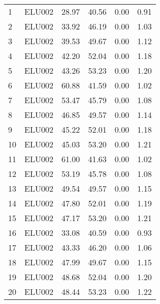 \begin{center}
\begin{footnotesize}
\tablelasttail{\hline}
\begin{supertabular}{|l|r|r|r|r|r|}
1 & ELU002 & 28.97 & 40.56 &  0.00 & 0.91\\
2 & ELU002 & 33.92 & 46.19 &  0.00 & 1.03\\
3 & ELU002 & 39.53 & 49.67 &  0.00 & 1.12\\
4 & ELU002 & 42.20 & 52.04 &  0.00 & 1.18\\
5 & ELU002 & 43.26 & 53.23 &  0.00 & 1.20\\
6 & ELU002 & 60.88 & 41.59 &  0.00 & 1.02\\
7 & ELU002 & 53.47 & 45.79 &  0.00 & 1.08\\
8 & ELU002 & 46.85 & 49.57 &  0.00 & 1.14\\
9 & ELU002 & 45.22 & 52.01 &  0.00 & 1.18\\
10 & ELU002 & 45.03 & 53.20 &  0.00 & 1.21\\
11 & ELU002 & 61.00 & 41.63 &  0.00 & 1.02\\
12 & ELU002 & 53.19 & 45.78 &  0.00 & 1.08\\
13 & ELU002 & 49.54 & 49.57 &  0.00 & 1.15\\
14 & ELU002 & 47.80 & 52.01 &  0.00 & 1.19\\
15 & ELU002 & 47.17 & 53.20 &  0.00 & 1.21\\
16 & ELU002 & 33.08 & 40.59 &  0.00 & 0.93\\
17 & ELU002 & 43.33 & 46.20 &  0.00 & 1.06\\
18 & ELU002 & 47.99 & 49.67 &  0.00 & 1.15\\
19 & ELU002 & 48.68 & 52.04 &  0.00 & 1.20\\
20 & ELU002 & 48.44 & 53.23 &  0.00 & 1.22\\
\end{supertabular}
\end{footnotesize}
\end{center}
